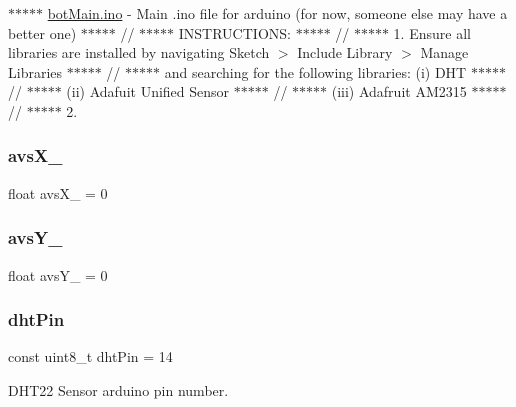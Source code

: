 $\ast$$\ast$$\ast$$\ast$$\ast$ \mbox{\hyperlink{bot_main_8ino}{bot\+Main.\+ino}} -\/ Main .ino file for arduino (for now, someone else may have a better one) $\ast$$\ast$$\ast$$\ast$$\ast$ // $\ast$$\ast$$\ast$$\ast$$\ast$ I\+N\+S\+T\+R\+U\+C\+T\+I\+O\+NS\+: $\ast$$\ast$$\ast$$\ast$$\ast$ // $\ast$$\ast$$\ast$$\ast$$\ast$ 1. Ensure all libraries are installed by navigating Sketch $>$ Include Library $>$ Manage Libraries $\ast$$\ast$$\ast$$\ast$$\ast$ // $\ast$$\ast$$\ast$$\ast$$\ast$ and searching for the following libraries\+: (i) D\+HT $\ast$$\ast$$\ast$$\ast$$\ast$ // $\ast$$\ast$$\ast$$\ast$$\ast$ (ii) Adafuit Unified Sensor $\ast$$\ast$$\ast$$\ast$$\ast$ // $\ast$$\ast$$\ast$$\ast$$\ast$ (iii) Adafruit A\+M2315 $\ast$$\ast$$\ast$$\ast$$\ast$ // $\ast$$\ast$$\ast$$\ast$$\ast$ 2. \mbox{\label{bot_main_8ino_a36b5ddac5fd4781d96ab1f7afb628e63}} 
\subsubsection{\texorpdfstring{avs\+X\+\_\+}{avsX\_}}
{\footnotesize\ttfamily float avs\+X\+\_\+ = 0}

\mbox{\label{bot_main_8ino_aa4d40143b7595abf8807c96ac5fd82e2}} 
\subsubsection{\texorpdfstring{avs\+Y\+\_\+}{avsY\_}}
{\footnotesize\ttfamily float avs\+Y\+\_\+ = 0}

\mbox{\label{bot_main_8ino_a89e40ffdf0114ea60292ff57879491e2}} 
\subsubsection{\texorpdfstring{dht\+Pin}{dhtPin}}
{\footnotesize\ttfamily const uint8\+\_\+t dht\+Pin = 14}



D\+H\+T22 Sensor arduino pin number. 

